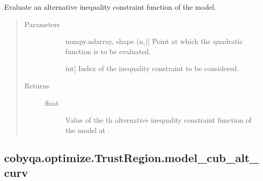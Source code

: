 \documentclass[letterpaper,10pt,english]{sphinxmanual}
\begin{document}
\begin{fulllineitems}
\begin{fulllineitems}
\label{\detokenize{refs/generated/cobyqa.optimize.TrustRegion.model_cub_alt:cobyqa.optimize.TrustRegion.model_cub_alt}}
\sphinxAtStartPar
Evaluate an alternative inequality constraint function of the model.
\begin{quote}\begin{description}
\item[{Parameters}] \leavevmode\begin{description}
\item[{}] \leavevmode{[}numpy.ndarray, shape (n,){]}
\sphinxAtStartPar
Point at which the quadratic function is to be evaluated.

\item[{}] \leavevmode{[}int{]}
\sphinxAtStartPar
Index of the inequality constraint to be considered.

\end{description}

\item[{Returns}] \leavevmode\begin{description}
\item[{float}] \leavevmode
\sphinxAtStartPar
Value of the \sphinxhyphen{}th alternative inequality constraint function of
the model at .

\end{description}

\end{description}\end{quote}

\end{fulllineitems}



\subsection{cobyqa.optimize.TrustRegion.model\_cub\_alt\_curv}
\label{\detokenize{refs/generated/cobyqa.optimize.TrustRegion.model_cub_alt_curv:cobyqa-optimize-trustregion-model-cub-alt-curv}}\label{\detokenize{refs/generated/cobyqa.optimize.TrustRegion.model_cub_alt_curv::doc}}


\end{fulllineitems}
\end{document}
